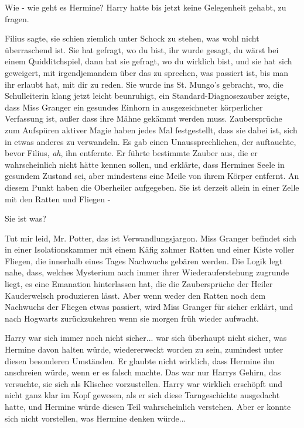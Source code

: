 \glqq{}Wie - wie geht es Hermine?\grqq{} Harry hatte bis jetzt keine Gelegenheit
gehabt, zu fragen.

\glqq{}Filius sagte, sie schien ziemlich unter Schock zu stehen, was wohl nicht
überraschend ist. Sie hat gefragt, wo du bist, ihr wurde gesagt, du wärst bei
einem Quidditchspiel, dann hat sie gefragt, wo du wirklich bist, und sie hat
sich geweigert, mit irgendjemandem über das zu sprechen, was passiert ist, bis
man ihr erlaubt hat, mit dir zu reden. Sie wurde ins St. Mungo's gebracht,
wo\grqq{}, die Schulleiterin klang jetzt leicht beunruhigt, \glqq{}ein
Standard-Diagnosezauber zeigte, dass Miss Granger ein gesundes Einhorn in
ausgezeichneter körperlicher Verfassung ist, außer dass ihre Mähne gekämmt
werden muss. Zaubersprüche zum Aufspüren aktiver Magie haben jedes Mal
festgestellt, dass sie dabei ist, sich in etwas anderes zu verwandeln. Es gab
einen Unaussprechlichen, der auftauchte, bevor Filius, \emph{ah}, ihn entfernte.
Er führte bestimmte Zauber aus, die er wahrscheinlich nicht hätte kennen sollen,
und erklärte, dass Hermines Seele in gesundem Zustand sei, aber mindestens eine
Meile von ihrem Körper entfernt. An diesem Punkt haben die Oberheiler
aufgegeben. Sie ist derzeit allein in einer Zelle mit den Ratten und Fliegen -\grqq{}

\glqq{}Sie ist was?\grqq{}

\glqq{}Tut mir leid, Mr. Potter, das ist Verwandlungsjargon. Miss Granger
befindet sich in einer Isolationskammer mit einem Käfig zahmer Ratten und einer
Kiste voller Fliegen, die innerhalb eines Tages Nachwuchs gebären werden. Die
Logik legt nahe, dass, welches Mysterium auch immer ihrer Wiederauferstehung
zugrunde liegt, es eine Emanation hinterlassen hat, die die Zaubersprüche der
Heiler Kauderwelsch produzieren lässt. Aber wenn weder den Ratten noch dem
Nachwuchs der Fliegen etwas passiert, wird Miss Granger für sicher erklärt, und
nach Hogwarts zurückzukehren wenn sie morgen früh wieder aufwacht.\grqq{}

Harry war sich immer noch nicht sicher... war sich überhaupt nicht sicher, was
Hermine davon halten würde, wiedererweckt worden zu sein, zumindest unter diesen
besonderen Umständen. Er glaubte nicht wirklich, dass Hermine ihn anschreien
würde, wenn er es falsch machte. Das war nur Harrys Gehirn, das versuchte, sie
sich als Klischee vorzustellen. Harry war wirklich erschöpft und nicht ganz klar
im Kopf gewesen, als er sich diese Tarngeschichte ausgedacht hatte, und Hermine
würde diesen Teil wahrscheinlich verstehen. Aber er konnte sich nicht
vorstellen, was Hermine denken würde...

